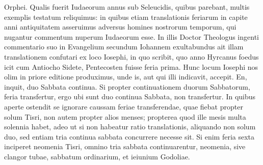 Orphei.
Qualis fuerit Iudaeorum annus sub Seleucidis, quibus parebant,
multis exemplis testatum reliquimus: in quibus etiam translationis
feriarum in capite anni antiquitatem asseruimus adversus homines
nostrorum temporum, qui nugantur commentum nuperum
Iudaeorum esse.
In illis Doctor Theologus ingenti commentario
suo in Evangelium secundum Iohannem exultabundus ait illam
translationem confutari ex loco Iosephi, in quo scribit, quo anno
Hyrcanus foedus icit cum Antiocho Sidete, Pentecosten fuisse feria
prima.
Hunc locum Iosephi nos olim in priore editione produximus,
unde is, aut qui illi indicavit, accepit.
En, inquit, duo Sabbata continua.
Si propter continuationem duorum Sabbatorum, feria transfertur,
ergo ubi sunt duo continua Sabbata, non transfertur. 
In quibus
aperte ostendit se ignorare caussam feriae transferendae, quae fiebat
propter solum Tisri, non autem propter alios menses; propterea
quod ille mesis multa solennia habet, adeo ut si non habeatur
ratio translationis, aliquando non solum duo, sed entiam tria continua
sabbata concurrere necesse sit.
{}
Si enim feria sexta inciperet
neomenia Tisri, omnino tria sabbata continuarentur, neomenia,
sive clangor tubae, sabbatum ordinarium, et ieiunium Godoliae.

